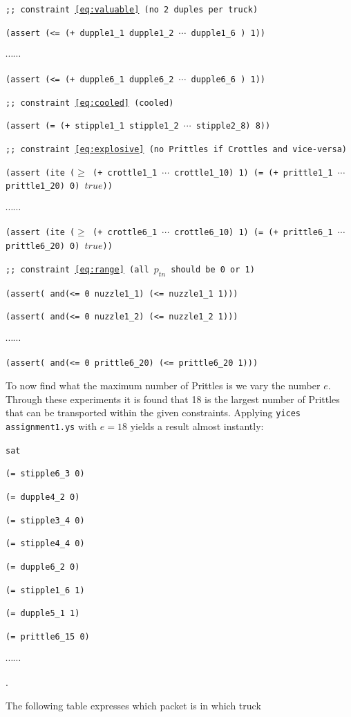 \documentclass[12pt]{article}
\begin{document}
{\tt ;; constraint~\ref{eq:valuable} (no 2 duples per truck)}

{\tt (assert (<= (+ dupple1\_1 dupple1\_2 $\cdots$ dupple1\_6 ) 1))}

$\cdots \cdots$

{\tt (assert (<= (+ dupple6\_1 dupple6\_2 $\cdots$ dupple6\_6 ) 1))}

{\tt ;; constraint~\ref{eq:cooled} (cooled)}

{\tt (assert (= (+ stipple1\_1 stipple1\_2 $\cdots$ stipple2\_8) 8))}

{\tt ;; constraint~\ref{eq:explosive} (no Prittles if Crottles and vice-versa)}

{\tt (assert (ite 	($\geq$ (+ crottle1\_1 $\cdots$ crottle1\_10) 1) 
	 		(= (+ prittle1\_1 $\cdots$ prittle1\_20) 0) $true$))}

$\cdots \cdots$

{\tt (assert (ite 	($\geq$ (+ crottle6\_1 $\cdots$ crottle6\_10) 1) 
	 		(= (+ prittle6\_1 $\cdots$ prittle6\_20) 0) $true$))}

{\tt ;; constraint~\ref{eq:range} (all $p_{tn}$ should be 0 or 1)}

{\tt (assert( and(<= 0 nuzzle1\_1) (<= nuzzle1\_1 1)))}

{\tt (assert( and(<= 0 nuzzle1\_2) (<= nuzzle1\_2 1)))}

$\cdots \cdots$

{\tt (assert( and(<= 0 prittle6\_20) (<= prittle6\_20 1)))}

To now find what the maximum number of Prittles is we vary the number $e$. 
Through these experiments it is found that 18 is the largest number of Prittles
that can be transported within the given constraints.
Applying {\tt yices assignment1.ys} with $e=18$ yields a result almost 
instantly:

{\footnotesize

{\tt sat }

{\tt (= stipple6\_3 0)}

{\tt (= dupple4\_2 0)}

{\tt (= stipple3\_4 0)}

{\tt (= stipple4\_4 0)}

{\tt (= dupple6\_2 0)}

{\tt (= stipple1\_6 1)}

{\tt (= dupple5\_1 1)}

{\tt (= prittle6\_15 0)}

$\cdots \cdots$ }.

The following table expresses which packet is in which truck
\end{document}

